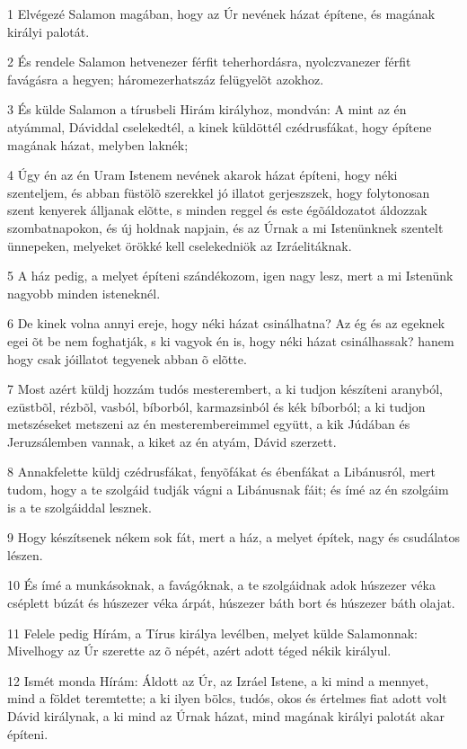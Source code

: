 \par 1 Elvégezé Salamon magában, hogy az Úr nevének házat építene, és magának királyi palotát.
\par 2 És rendele Salamon hetvenezer férfit teherhordásra, nyolczvanezer férfit favágásra a hegyen; háromezerhatszáz felügyelõt azokhoz.
\par 3 És külde Salamon a tírusbeli Hirám királyhoz, mondván: A mint az én atyámmal, Dáviddal cselekedtél, a kinek küldöttél czédrusfákat, hogy építene magának házat, melyben laknék;
\par 4 Úgy én az én Uram Istenem nevének akarok házat építeni, hogy néki szenteljem, és abban füstölõ szerekkel jó illatot gerjeszszek, hogy folytonosan szent kenyerek álljanak elõtte, s minden  reggel és este égõáldozatot áldozzak szombatnapokon, és új holdnak napjain, és az Úrnak a mi Istenünknek szentelt ünnepeken, melyeket örökké kell cselekedniök az Izráelitáknak.
\par 5 A ház pedig, a melyet építeni szándékozom, igen nagy lesz, mert a mi Istenünk nagyobb minden isteneknél.
\par 6 De kinek volna annyi ereje, hogy néki házat csinálhatna? Az ég és az egeknek egei õt be nem foghatják, s ki vagyok én is, hogy néki házat csinálhassak? hanem hogy csak jóillatot tegyenek abban õ elõtte.
\par 7 Most azért küldj hozzám tudós mesterembert, a ki tudjon készíteni aranyból, ezüstbõl, rézbõl, vasból, bíborból, karmazsinból és kék bíborból; a ki tudjon metszéseket metszeni az én mesterembereimmel együtt, a kik Júdában és Jeruzsálemben vannak, a kiket az én atyám, Dávid szerzett.
\par 8 Annakfelette küldj czédrusfákat, fenyõfákat és ébenfákat a Libánusról, mert tudom, hogy a te szolgáid tudják vágni a Libánusnak fáit; és ímé az én szolgáim is a te szolgáiddal lesznek.
\par 9 Hogy készítsenek nékem sok fát, mert a ház, a melyet építek, nagy és csudálatos lészen.
\par 10 És ímé a munkásoknak, a favágóknak, a te szolgáidnak adok húszezer véka cséplett búzát és húszezer véka árpát, húszezer báth bort és húszezer báth olajat.
\par 11 Felele pedig Hírám, a Tírus királya levélben, melyet külde Salamonnak: Mivelhogy az Úr szerette az õ népét, azért adott téged nékik királyul.
\par 12 Ismét monda Hírám: Áldott az Úr, az Izráel Istene, a ki mind a mennyet, mind a földet teremtette; a ki ilyen bölcs, tudós, okos és értelmes fiat adott volt Dávid királynak, a ki mind az Úrnak házat, mind magának királyi palotát akar építeni.
